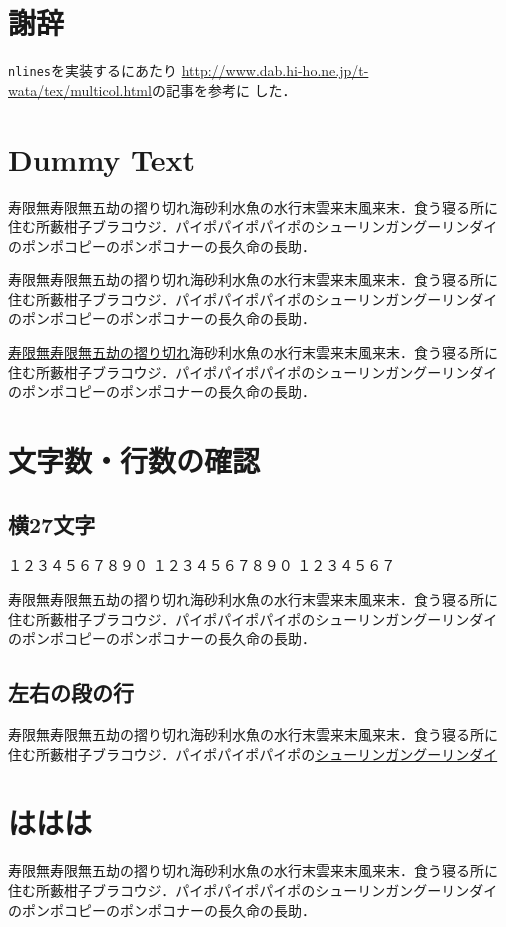 \documentclass[a4j, 12Q, twocolumn, twoside]{jsarticle}
\newcommand{\cmd}[1]{\texttt{\symbol{"5C}#1}} %
\begin{document}
\section{謝辞}
\cmd{nlines}を実装するにあたり
\url{http://www.dab.hi-ho.ne.jp/t-wata/tex/multicol.html}の記事を参考に
した．

\section{Dummy Text}
寿限無寿限無五劫の摺り切れ海砂利水魚の水行末雲来末風来末．食う寝る所に
住む所藪柑子ブラコウジ．パイポパイポパイポのシューリンガングーリンダイ
のポンポコピーのポンポコナーの長久命の長助．

寿限無寿限無五劫の摺り切れ海砂利水魚の水行末雲来末風来末．食う寝る所に
住む所藪柑子ブラコウジ．パイポパイポパイポのシューリンガングーリンダイ
のポンポコピーのポンポコナーの長久命の長助．

\underline{寿限無寿限無五劫の摺り切れ}海砂利水魚の水行末雲来末風来末．食う寝る所に
住む所藪柑子ブラコウジ．パイポパイポパイポのシューリンガングーリンダイ
のポンポコピーのポンポコナーの長久命の長助．


\clearpage
\appendix
\section{文字数・行数の確認}
\subsection{横27文字}
\noindent
１２３４５６７８９０
１２３４５６７８９０
１２３４５６７%

寿限無寿限無五劫の摺り切れ海砂利水魚の水行末雲来末風来末．食う寝る所に
住む所藪柑子ブラコウジ．パイポパイポパイポのシューリンガングーリンダイ
のポンポコピーのポンポコナーの長久命の長助．

\subsection{左右の段の行}


寿限無寿限無五劫の摺り切れ海砂利水魚の水行末雲来末風来末．食う寝る所に
住む所藪柑子ブラコウジ．パイポパイポパイポの\underline{シューリンガングーリンダイ}


\section{ははは}
寿限無寿限無五劫の摺り切れ海砂利水魚の水行末雲来末風来末．食う寝る所に
住む所藪柑子ブラコウジ．パイポパイポパイポのシューリンガングーリンダイ
のポンポコピーのポンポコナーの長久命の長助．
\end{document}
